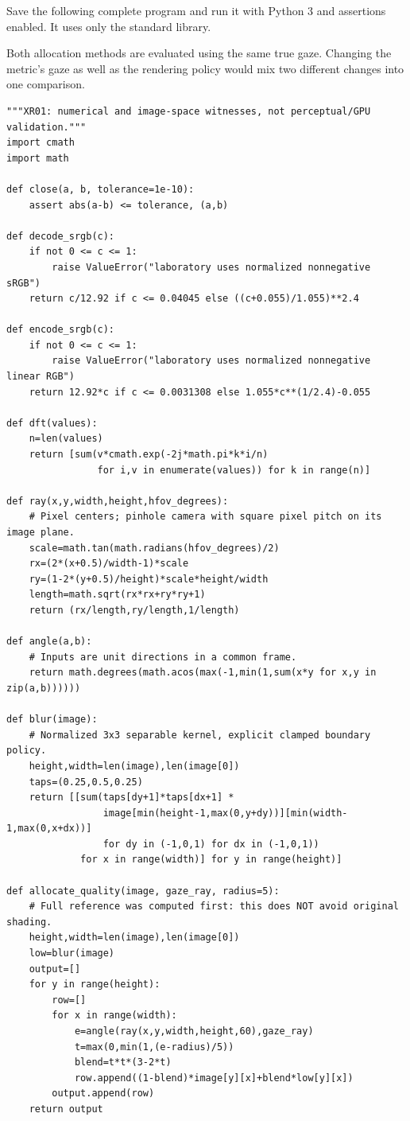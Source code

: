 \hypertarget{04-visual-computing-ii-ch042-complete-numerical-and-image-space-laboratory}{}

Save the following complete program and run it with Python 3 and assertions enabled. It uses only the standard library.

Both allocation methods are evaluated using the same true gaze. Changing the metric's gaze as well as the rendering policy would mix two different changes into one comparison.

\begin{verbatim}
"""XR01: numerical and image-space witnesses, not perceptual/GPU validation."""
import cmath
import math

def close(a, b, tolerance=1e-10):
    assert abs(a-b) <= tolerance, (a,b)

def decode_srgb(c):
    if not 0 <= c <= 1:
        raise ValueError("laboratory uses normalized nonnegative sRGB")
    return c/12.92 if c <= 0.04045 else ((c+0.055)/1.055)**2.4

def encode_srgb(c):
    if not 0 <= c <= 1:
        raise ValueError("laboratory uses normalized nonnegative linear RGB")
    return 12.92*c if c <= 0.0031308 else 1.055*c**(1/2.4)-0.055

def dft(values):
    n=len(values)
    return [sum(v*cmath.exp(-2j*math.pi*k*i/n)
                for i,v in enumerate(values)) for k in range(n)]

def ray(x,y,width,height,hfov_degrees):
    # Pixel centers; pinhole camera with square pixel pitch on its image plane.
    scale=math.tan(math.radians(hfov_degrees)/2)
    rx=(2*(x+0.5)/width-1)*scale
    ry=(1-2*(y+0.5)/height)*scale*height/width
    length=math.sqrt(rx*rx+ry*ry+1)
    return (rx/length,ry/length,1/length)

def angle(a,b):
    # Inputs are unit directions in a common frame.
    return math.degrees(math.acos(max(-1,min(1,sum(x*y for x,y in zip(a,b))))))

def blur(image):
    # Normalized 3x3 separable kernel, explicit clamped boundary policy.
    height,width=len(image),len(image[0])
    taps=(0.25,0.5,0.25)
    return [[sum(taps[dy+1]*taps[dx+1] *
                 image[min(height-1,max(0,y+dy))][min(width-1,max(0,x+dx))]
                 for dy in (-1,0,1) for dx in (-1,0,1))
             for x in range(width)] for y in range(height)]

def allocate_quality(image, gaze_ray, radius=5):
    # Full reference was computed first: this does NOT avoid original shading.
    height,width=len(image),len(image[0])
    low=blur(image)
    output=[]
    for y in range(height):
        row=[]
        for x in range(width):
            e=angle(ray(x,y,width,height,60),gaze_ray)
            t=max(0,min(1,(e-radius)/5))
            blend=t*t*(3-2*t)
            row.append((1-blend)*image[y][x]+blend*low[y][x])
        output.append(row)
    return output


\end{verbatim}
